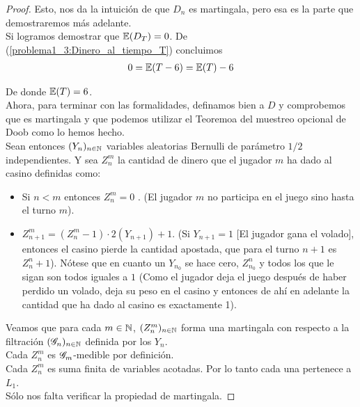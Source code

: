 \begin{proof}
		   	Esto, nos da la intuición de que $D_n$ es martingala, pero esa es la parte que demostraremos más adelante.\\
		   
			Si logramos demostrar que $\mathbb{E}(D_T) = 0$. De (\ref{problema1_3:Dinero_al_tiempo_T}) concluimos
			\begin{align}
				0 = \mathbb{E}(T - 6) = \mathbb{E}(T) - 6
			\end{align}
			
			De donde $\mathbb{E}(T) = 6$.\\
			
			Ahora, para terminar con las formalidades, definamos bien a $D$ y comprobemos que es martingala y 
			que podemos utilizar el Teoremoa del muestreo opcional de Doob como lo hemos hecho.\\
			
			Sean entonces $(Y_n)_{n \in \mathbb{N}}$ variables aleatorias Bernulli de parámetro $1/2$ independientes.
			Y sea $Z_n^m$ la cantidad de dinero que el jugador $m$ ha dado al casino definidas como:
			
			\begin{itemize}
				\item 
					Si $n < m$ entonces $Z_n^m = 0$ . (El jugador $m$ no participa en el juego sino hasta el turno $m$).
				\item
					$Z_{n+1}^{m} = (Z_n^{m} - 1) \cdot 2(Y_{n+1}) + 1$. (Si $Y_{n + 1} = 1$ [El jugador gana el volado], entonces el casino
					pierde la cantidad apostada, que para el turno $n+1$ es $Z_n^n + 1$). Nótese que en cuanto un $Y_{n_0}$ se hace cero,
					$Z_{n_0}^{n}$ y todos los que le sigan son todos iguales a $1$ (Como el jugador deja el juego después de haber perdido
					un volado, deja su peso en el casino y entonces de ahí en adelante la cantidad que ha dado al casino es exactamente 1).
			\end{itemize}
			
			Veamos que para cada $m \in \mathbb{N}$, $(Z_n^m)_{n \in \mathbb{N}}$ forma una martingala con respecto a la filtración $(\mathscr{G}_n)_{n \in \mathbb{N}}$ 
			definida por los $Y_n$.\\
			
			Cada $Z_n^m$ es $\mathscr{G}_m$-medible por definición.\\
			
			Cada $Z_n^m$ es suma finita de variables acotadas. Por lo tanto cada una pertenece a $L_1$.\\
			
			Sólo nos falta verificar la propiedad de martingala.
			

\end{proof}
